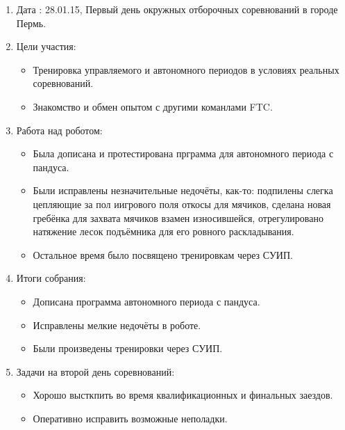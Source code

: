 \begin{enumerate}
  	
  \item Дата : 28.01.15, Первый день окружных отборочных соревнований в городе Пермь.
  
  \item Цели участия:
  \begin{itemize}
    \item Тренировка управляемого и автономного периодов в условиях реальных соревнований.
		
	\item Знакомство и обмен опытом с другими команлами FTC.
  \end{itemize}

  \item Работа над роботом:
  \begin{itemize}
    \item Была дописана и протестирована прграмма для автономного периода с пандуса.
	
	\item Были исправлены незначительные недочёты, как-то: подпилены слегка цепляющие за пол иигрового поля откосы для мячиков, сделана новая гребёнка для захвата мячиков взамен износившейся, отрегулировано натяжение лесок подъёмника для его ровного раскладывания.
    
    \item Остальное время было посвящено тренировкам через СУИП.
  
  \end{itemize}
	
  \item Итоги собрания:
  \begin{itemize}
	\item Дописана программа автономного периода с пандуса.
    
    \item Исправлены мелкие недочёты в роботе.
    
	\item Были произведены тренировки через СУИП.
	
  \end{itemize}
	
  \item Задачи на второй день соревнований:
  \begin{itemize}
    \item Хорошо высткпить во время квалификационных и финальных заездов.
    
    \item Оперативно исправить возможные неполадки.
  \end{itemize}
\end{enumerate}
\fillpage